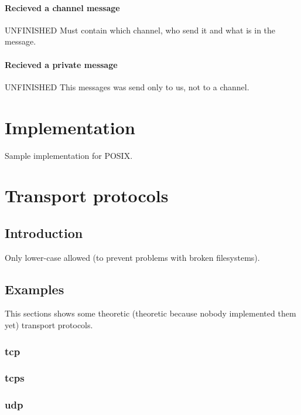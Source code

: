 \documentclass[12pt,a4paper]{book}
\begin{document}
\subsubsection{Recieved a channel message}
UNFINISHED
Must contain which channel, who send it and what is in the message.
\subsubsection{Recieved a private message}
UNFINISHED
This messages was send only to us, not to a channel.
\chapter{Implementation}
Sample implementation for POSIX.

\chapter{Transport protocols}
\section{Introduction}
Only lower-case allowed (to prevent problems with broken filesystems).
\section{Examples}
This sections shows some theoretic (theoretic because nobody implemented
them yet) transport protocols.
\subsection{tcp}
\subsection{tcps}
\subsection{udp}
\end{document}
